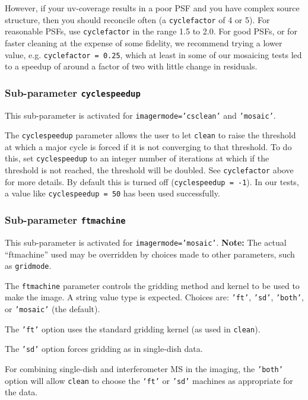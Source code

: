 However, if your uv-coverage results in a poor PSF and you have
complex source structure, then you should reconcile often (a
{\tt cyclefactor} of 4 or 5). For reasonable PSFs, use
{\tt cyclefactor} in the range 1.5 to 2.0. For good PSFs, or for
faster cleaning at the expense of some fidelity, we recommend trying a
lower value, e.g. {\tt cyclefactor = 0.25}, which at least in some
of our mosaicing tests led to a speedup of around a factor of two with
little change in residuals. 

\subsubsection{Sub-parameter {\tt cyclespeedup} }
\label{section:im.clean.imagermode.cyclespeedup}

This sub-parameter is activated for {\tt imagermode='csclean'} and
{\tt 'mosaic'}.

The {\tt cyclespeedup} parameter allows the user to let {\tt clean}
to raise the threshold at which a major cycle is forced if it is not
converging to that threshold.  To do this, set {\tt cyclespeedup} to
an integer number of iterations at which if the threshold is not reached,
the threshold will be doubled.  See {\tt cyclefactor} above for more
details.  By default this is turned off ({\tt cyclespeedup = -1}).
In our tests, a value like {\tt cyclespeedup = 50} has been used successfully.

\subsubsection{Sub-parameter {\tt ftmachine} }
\label{section:im.imagermode.mosaic.ftmachine}

This sub-parameter is activated for {\tt imagermode='mosaic'}. 
{\bf Note:} The actual ``ftmachine'' used may be overridden by choices
made to other parameters, such as {\tt gridmode}.

The {\tt ftmachine} parameter controls the gridding method and kernel to be
used to make the image.  A string value type is expected.
Choices are: {\tt 'ft'}, {\tt 'sd'}, {\tt 'both'}, or {\tt 'mosaic'} (the default).

The {\tt 'ft'} option uses the standard gridding kernel (as used in 
{\tt clean}).

The {\tt 'sd'} option forces gridding as in single-dish data.

For combining single-dish and interferometer MS in the imaging, the
{\tt 'both'} option will allow {\tt clean} to choose the {\tt `ft'}
or {\tt 'sd'} machines as appropriate for the data.

